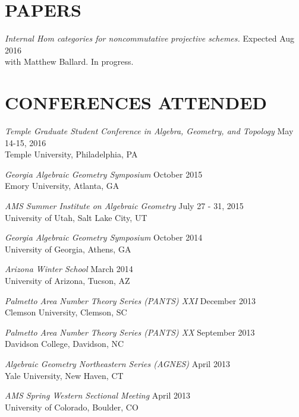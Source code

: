 \documentclass[line,overlapped]{res}
\begin{document}
\begin{resume}
 \section{PAPERS}
         {\sl  Internal Hom categories for noncommutative projective schemes.} \hfill Expected Aug 2016\\
	 with Matthew Ballard.  In progress.

 \newpage

 \section{CONFERENCES ATTENDED}

         {\sl Temple Graduate Student Conference in Algebra, Geometry, and Topology} \hfill May 14-15, 2016\\
         Temple University, Philadelphia, PA
         
         {\sl Georgia Algebraic Geometry Symposium} \hfill October 2015\\
         Emory University, Atlanta, GA

         {\sl AMS Summer Institute on Algebraic Geometry} \hfill July 27 - 31, 2015\\
         University of Utah, Salt Lake City, UT

         {\sl Georgia Algebraic Geometry Symposium} \hfill October 2014\\
         University of Georgia, Athens, GA

         {\sl Arizona Winter School} \hfill March 2014\\
         University of Arizona, Tucson, AZ

         {\sl Palmetto Area Number Theory Series (PANTS) XXI} \hfill December 2013\\
         Clemson University, Clemson, SC

         {\sl Palmetto Area Number Theory Series (PANTS) XX} \hfill September 2013\\
         Davidson College, Davidson, NC

         {\sl Algebraic Geometry Northeastern Series (AGNES)} \hfill April 2013\\
         Yale University, New Haven, CT

         {\sl AMS Spring Western Sectional Meeting} \hfill April 2013\\
         University of Colorado, Boulder, CO


\end{resume}
\end{document}
